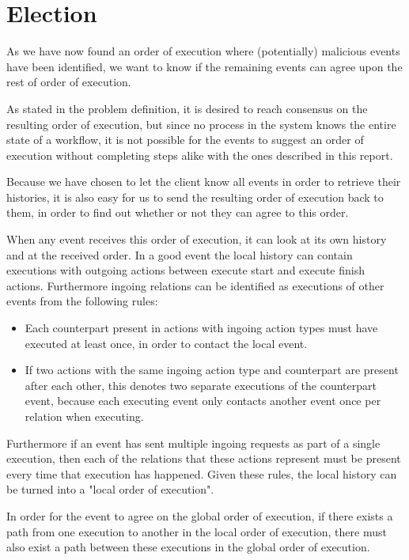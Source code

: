 

	\section{Election} 
	As we have now found an order of execution where (potentially) malicious events have been identified, we want to know if the remaining events can agree upon the rest of order of execution.
	
	\newpar As stated in the problem definition, it is desired to reach consensus on the resulting order of execution, but since no process in the system knows the entire state of a workflow, it is not possible for the events to suggest an order of execution without completing steps alike with the ones described in this report.
	
	\newpar Because we have chosen to let the client know all events in order to retrieve their histories, it is also easy for us to send the resulting order of execution back to them, in order to find out whether or not they can agree to this order.
	
	\newpar When any event receives this order of execution, it can look at its own history and at the received order. In a good event the local history can contain executions with outgoing actions between execute start and execute finish actions. Furthermore ingoing relations can be identified as executions of other events from the following rules:
	
	\begin{itemize}
		\item Each counterpart present in actions with ingoing action types must have executed at least once, in order to contact the local event.
		\item If two actions with the same ingoing action type and counterpart are present after each other, this denotes two separate executions of the counterpart event, because each executing event only contacts another event once per relation when executing.
	\end{itemize}
	
	\newpar Furthermore if an event has sent multiple ingoing requests as part of a single execution, then each of the relations that these actions represent must be present every time that execution has happened. Given these rules, the local history can be turned into a "local order of execution".
	
	\newpar In order for the event to agree on the global order of execution, if there exists a path from one execution to another in the local order of execution, there must also exist a path between these executions in the global order of execution.
	
	\newpar {}